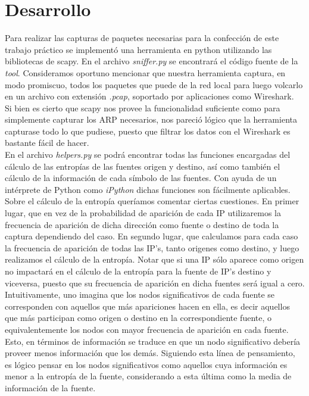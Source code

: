 \section{Desarrollo}

\indent \indent Para realizar las capturas de paquetes necesarias para la confección de este trabajo práctico se implementó una herramienta en python utilizando las bibliotecas de scapy. En el archivo \textit{sniffer.py} se encontrará el código fuente de la \textit{tool}. Consideramos oportuno mencionar que nuestra herramienta captura, en modo promiscuo, todos los paquetes que puede de la red local para luego volcarlo en un archivo con extensión \textit{.pcap}, soportado por aplicaciones como Wireshark.\\
\indent Si bien es cierto que scapy nos provee la funcionalidad suficiente como para simplemente capturar los ARP necesarios, nos pareció lógico que la herramienta capturase todo lo que pudiese, puesto que filtrar los datos con el Wireshark es bastante fácil de hacer.\\
\indent En el archivo \textit{helpers.py} se podrá encontrar todas las funciones encargadas del cálculo de las entropías de las fuentes origen y destino, así como también el cálculo de la información de cada símbolo de las fuentes. Con ayuda de un intérprete de Python como \textit{iPython} dichas funciones son fácilmente aplicables.\\
\indent Sobre el cálculo de la entropía queríamos comentar ciertas cuestiones. En primer lugar, que en vez de la probabilidad de aparición de cada IP utilizaremos la frecuencia de aparición de dicha dirección como fuente o destino de toda la captura dependiendo del caso. En segundo lugar, que calculamos para cada caso la frecuencia de aparición de todas las IP's, tanto origenes como destino, y luego realizamos el cálculo de la entropía. Notar que si una IP sólo aparece como origen no impactará en el cálculo de la entropía para la fuente de IP's destino y viceversa, puesto que su frecuencia de aparición en dicha fuentes será igual a cero.\\
\indent Intuitivamente, uno imagina que los nodos significativos de cada fuente se corresponden con aquellos que más apariciones hacen en ella, es decir aquellos que más participan como origen o destino en la correspondiente fuente, o equivalentemente los nodos con mayor frecuencia de aparición en cada fuente. Esto, en términos de información se traduce en que un nodo significativo debería proveer menos información que los demás. Siguiendo esta línea de pensamiento, es lógico pensar en los nodos significativos como aquellos cuya información es menor a la entropía de la fuente, considerando a esta última como la media de información de la fuente.\\
